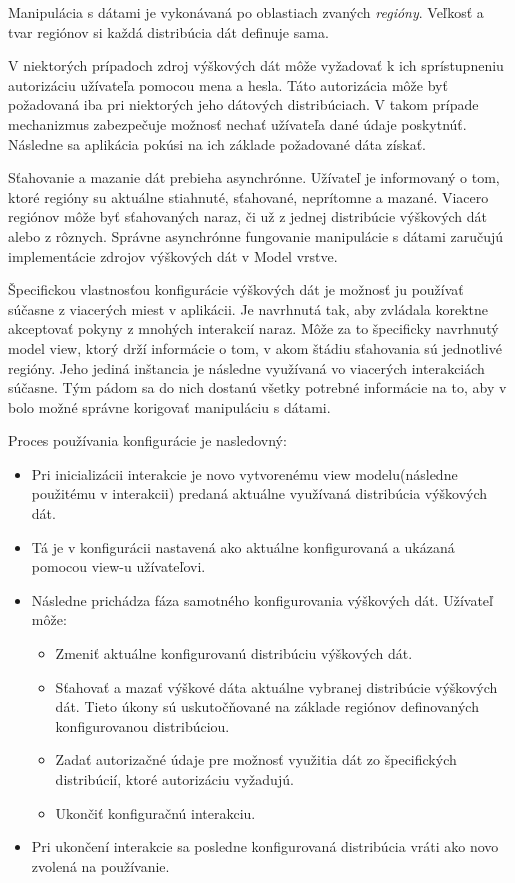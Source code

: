 Manipulácia s dátami je vykonávaná po oblastiach zvaných \textit{regióny}. Veľkosť a tvar regiónov si každá distribúcia dát definuje sama. 

V niektorých prípadoch zdroj výškových dát môže vyžadovať k ich sprístupneniu autorizáciu užívateľa pomocou mena a hesla. Táto autorizácia môže byť požadovaná iba pri niektorých jeho dátových distribúciach. V takom prípade mechanizmus zabezpečuje možnosť nechať užívateľa dané údaje poskytnúť. Následne sa aplikácia pokúsi na ich základe požadované dáta získať.   

Sťahovanie a mazanie dát prebieha asynchrónne. Užívateľ je informovaný o tom, ktoré regióny su aktuálne stiahnuté, sťahované, neprítomne a mazané. Viacero regiónov môže byť sťahovaných naraz, či už z jednej distribúcie výškových dát alebo z rôznych. Správne asynchrónne fungovanie manipulácie s dátami zaručujú implementácie zdrojov výškových dát v Model vrstve.

Špecifickou vlastnosťou konfigurácie výškových dát je možnosť ju používať súčasne z viacerých miest v aplikácii. Je navrhnutá tak, aby zvládala korektne akceptovať pokyny z mnohých interakcií naraz. Môže za to špecificky navrhnutý model view, ktorý drží informácie o tom, v akom štádiu sťahovania sú jednotlivé regióny. Jeho jediná inštancia je následne využívaná vo viacerých interakciách súčasne. Tým pádom sa do nich dostanú všetky potrebné informácie na to, aby v bolo možné správne korigovať manipuláciu s dátami.

Proces používania konfigurácie je nasledovný:
\begin{itemize}
    \item Pri inicializácii interakcie je novo vytvorenému view modelu(následne použitému v interakcii) predaná aktuálne využívaná distribúcia výškových dát.
    \item Tá je v konfigurácii nastavená ako aktuálne konfigurovaná a ukázaná pomocou view-u užívateľovi.
    \item Následne prichádza fáza samotného konfigurovania výškových dát. Užívateľ môže:
    \begin{itemize}
        \item Zmeniť aktuálne konfigurovanú distribúciu výškových dát.
        \item Sťahovať a mazať výškové dáta aktuálne vybranej distribúcie výškových dát. Tieto úkony sú uskutočňované na základe regiónov definovaných konfigurovanou distribúciou.
        \item Zadať autorizačné údaje pre možnosť využitia dát zo špecifických distribúcií, ktoré autorizáciu vyžadujú. 
        \item Ukončiť konfiguračnú interakciu.
    \end{itemize} 
    \item Pri ukončení interakcie sa posledne konfigurovaná distribúcia vráti ako novo zvolená na používanie.
\end{itemize}

